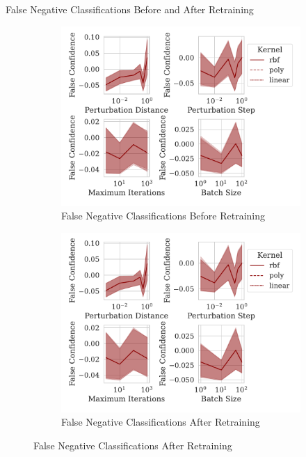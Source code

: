 \documentclass{beamer}
\begin{document}
\begin{frame}{False Negative Classifications Before and After Retraining}
  \begin{figure}
    \centering
    \begin{subfigure}[b]{0.45\textwidth}
      \centering
      \includegraphics[width=\textwidth]{./generated/confidence_vs_attack_parameters.pdf}
      \caption{False Negative Classifications Before Retraining}
    \end{subfigure}
    \centering
    \begin{subfigure}[b]{0.45\textwidth}
      \centering
      \includegraphics[width=\textwidth]{./generated/retrain_confidence_vs_attack_parameters.pdf}
      \caption{False Negative Classifications After Retraining}
    \end{subfigure}
  \end{figure}
\end{frame}
\end{document}
